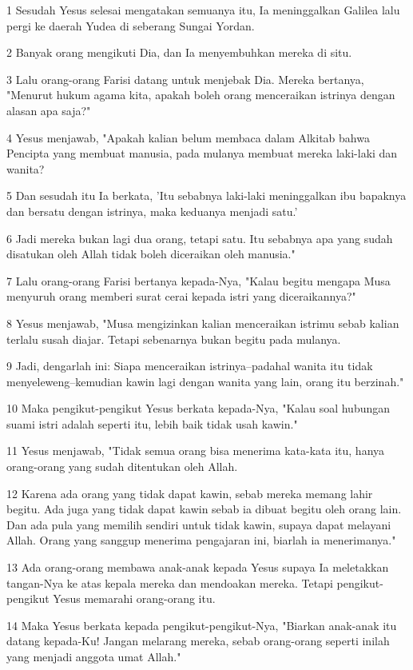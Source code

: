 \par 1 Sesudah Yesus selesai mengatakan semuanya itu, Ia meninggalkan Galilea lalu pergi ke daerah Yudea di seberang Sungai Yordan.
\par 2 Banyak orang mengikuti Dia, dan Ia menyembuhkan mereka di situ.
\par 3 Lalu orang-orang Farisi datang untuk menjebak Dia. Mereka bertanya, "Menurut hukum agama kita, apakah boleh orang menceraikan istrinya dengan alasan apa saja?"
\par 4 Yesus menjawab, "Apakah kalian belum membaca dalam Alkitab bahwa Pencipta yang membuat manusia, pada mulanya membuat mereka laki-laki dan wanita?
\par 5 Dan sesudah itu Ia berkata, 'Itu sebabnya laki-laki meninggalkan ibu bapaknya dan bersatu dengan istrinya, maka keduanya menjadi satu.'
\par 6 Jadi mereka bukan lagi dua orang, tetapi satu. Itu sebabnya apa yang sudah disatukan oleh Allah tidak boleh diceraikan oleh manusia."
\par 7 Lalu orang-orang Farisi bertanya kepada-Nya, "Kalau begitu mengapa Musa menyuruh orang memberi surat cerai kepada istri yang diceraikannya?"
\par 8 Yesus menjawab, "Musa mengizinkan kalian menceraikan istrimu sebab kalian terlalu susah diajar. Tetapi sebenarnya bukan begitu pada mulanya.
\par 9 Jadi, dengarlah ini: Siapa menceraikan istrinya--padahal wanita itu tidak menyeleweng--kemudian kawin lagi dengan wanita yang lain, orang itu berzinah."
\par 10 Maka pengikut-pengikut Yesus berkata kepada-Nya, "Kalau soal hubungan suami istri adalah seperti itu, lebih baik tidak usah kawin."
\par 11 Yesus menjawab, "Tidak semua orang bisa menerima kata-kata itu, hanya orang-orang yang sudah ditentukan oleh Allah.
\par 12 Karena ada orang yang tidak dapat kawin, sebab mereka memang lahir begitu. Ada juga yang tidak dapat kawin sebab ia dibuat begitu oleh orang lain. Dan ada pula yang memilih sendiri untuk tidak kawin, supaya dapat melayani Allah. Orang yang sanggup menerima pengajaran ini, biarlah ia menerimanya."
\par 13 Ada orang-orang membawa anak-anak kepada Yesus supaya Ia meletakkan tangan-Nya ke atas kepala mereka dan mendoakan mereka. Tetapi pengikut-pengikut Yesus memarahi orang-orang itu.
\par 14 Maka Yesus berkata kepada pengikut-pengikut-Nya, "Biarkan anak-anak itu datang kepada-Ku! Jangan melarang mereka, sebab orang-orang seperti inilah yang menjadi anggota umat Allah."
